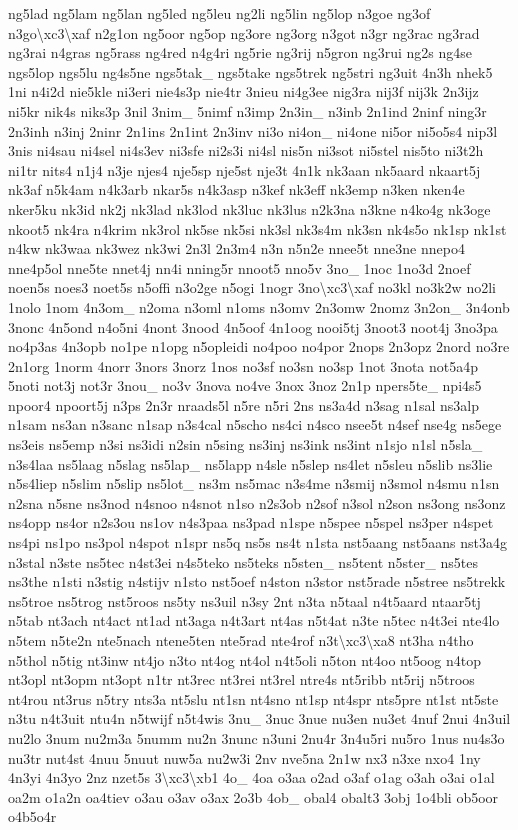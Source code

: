 \begin{DoxyCompactItemize}
ng5lad ng5lam ng5lan ng5led ng5leu ng2li ng5lin ng5lop n3goe ng3of n3go\textbackslash{}xc3\textbackslash{}xaf n2g1on ng5oor ng5op ng3ore ng3org n3got n3gr ng3rac ng3rad ng3rai n4gras ng5rass ng4red n4g4ri ng5rie ng3rij n5gron ng3rui ng2s ng4se ngs5lop ngs5lu ng4s5ne ngs5tak\-\_\- ngs5take ngs5trek ng5stri ng3uit 4n3h nhek5 1ni n4i2d nie5kle ni3eri nie4s3p nie4tr 3nieu ni4g3ee nig3ra nij3f nij3k 2n3ijz ni5kr nik4s niks3p 3nil 3nim\-\_\- 5nimf n3imp 2n3in\-\_\- n3inb 2n1ind 2ninf ning3r 2n3inh n3inj 2ninr 2n1ins 2n1int 2n3inv ni3o ni4on\-\_\- ni4one ni5or ni5o5s4 nip3l 3nis ni4sau ni4sel ni4s3ev ni3sfe ni2s3i ni4sl nis5n ni3sot ni5stel nis5to ni3t2h ni1tr nits4 n1j4 n3je njes4 nje5sp nje5st nje3t 4n1k nk3aan nk5aard nkaart5j nk3af n5k4am n4k3arb nkar5s n4k3asp n3kef nk3eff nk3emp n3ken nken4e nker5ku nk3id nk2j nk3lad nk3lod nk3luc nk3lus n2k3na n3kne n4ko4g nk3oge nkoot5 nk4ra n4krim nk3rol nk5se nk5si nk3sl nk3s4m nk3sn nk4s5o nk1sp nk1st n4kw nk3waa nk3wez nk3wi 2n3l 2n3m4 n3n n5n2e nnee5t nne3ne nnepo4 nne4p5ol nne5te nnet4j nn4i nning5r nnoot5 nno5v 3no\-\_\- 1noc 1no3d 2noef noen5s noes3 noet5s n5offi n3o2ge n5ogi 1nogr 3no\textbackslash{}xc3\textbackslash{}xaf no3kl no3k2w no2li 1nolo 1nom 4n3om\-\_\- n2oma n3oml n1oms n3omv 2n3omw 2nomz 3n2on\-\_\- 3n4onb 3nonc 4n5ond n4o5ni 4nont 3nood 4n5oof 4n1oog nooi5tj 3noot3 noot4j 3no3pa no4p3as 4n3opb no1pe n1opg n5opleidi no4poo no4por 2nops 2n3opz 2nord no3re 2n1org 1norm 4norr 3nors 3norz 1nos no3sf no3sn no3sp 1not 3nota not5a4p 5noti not3j not3r 3nou\-\_\- no3v 3nova no4ve 3nox 3noz 2n1p npers5te\-\_\- npi4s5 npoor4 npoort5j n3ps 2n3r nraads5l n5re n5ri 2ns ns3a4d n3sag n1sal ns3alp n1sam ns3an n3sanc n1sap n3s4cal n5scho ns4ci n4sco nsee5t n4sef nse4g ns5ege ns3eis ns5emp n3si ns3idi n2sin n5sing ns3inj ns3ink ns3int n1sjo n1sl n5sla\-\_\- n3s4laa ns5laag n5slag ns5lap\-\_\- ns5lapp n4sle n5slep ns4let n5sleu n5slib ns3lie n5s4liep n5slim n5slip ns5lot\-\_\- ns3m ns5mac n3s4me n3smij n3smol n4smu n1sn n2sna n5sne ns3nod n4snoo n4snot n1so n2s3ob n2sof n3sol n2son ns3ong ns3onz ns4opp ns4or n2s3ou ns1ov n4s3paa ns3pad n1spe n5spee n5spel ns3per n4spet ns4pi ns1po ns3pol n4spot n1spr ns5q ns5s ns4t n1sta nst5aang nst5aans nst3a4g n3stal n3ste ns5tec n4st3ei n4s5teko ns5teks n5sten\-\_\- ns5tent n5ster\-\_\- ns5tes ns3the n1sti n3stig n4stijv n1sto nst5oef n4ston n3stor nst5rade n5stree ns5trekk ns5troe ns5trog nst5roos ns5ty ns3uil n3sy 2nt n3ta n5taal n4t5aard ntaar5tj n5tab nt3ach nt4act nt1ad nt3aga n4t3art nt4as n5t4at n3te n5tec n4t3ei nte4lo n5tem n5te2n nte5nach ntene5ten nte5rad nte4rof n3t\textbackslash{}xc3\textbackslash{}xa8 nt3ha n4tho n5thol n5tig nt3inw nt4jo n3to nt4og nt4ol n4t5oli n5ton nt4oo nt5oog n4top nt3opl nt3opm nt3opt n1tr nt3rec nt3rei nt3rel ntre4s nt5ribb nt5rij n5troos nt4rou nt3rus n5try nts3a nt5slu nt1sn nt4sno nt1sp nt4spr nts5pre nt1st nt5ste n3tu n4t3uit ntu4n n5twijf n5t4wis 3nu\-\_\- 3nuc 3nue nu3en nu3et 4nuf 2nui 4n3uil nu2lo 3num nu2m3a 5numm nu2n 3nunc n3uni 2nu4r 3n4u5ri nu5ro 1nus nu4s3o nu3tr nut4st 4nuu 5nuut nuw5a nu2w3i 2nv nve5na 2n1w nx3 n3xe nxo4 1ny 4n3yi 4n3yo 2nz nzet5s 3\textbackslash{}xc3\textbackslash{}xb1 4o\-\_\- 4oa o3aa o2ad o3af o1ag o3ah o3ai o1al oa2m o1a2n oa4tiev o3au o3av o3ax 2o3b 4ob\-\_\- obal4 obalt3 3obj 1o4bli ob5oor o4b5o4r 
\end{DoxyCompactItemize}
